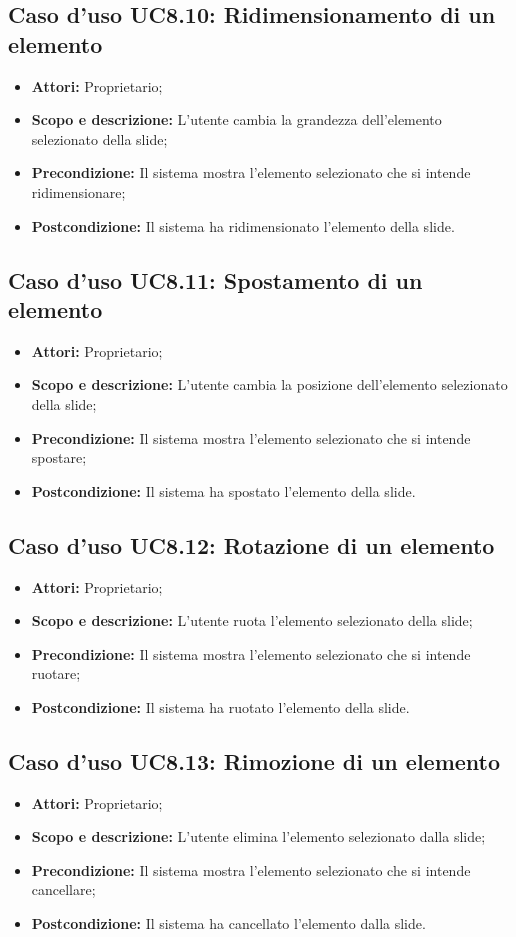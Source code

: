 \subsection{Caso d'uso UC8.10: Ridimensionamento di un elemento}
\begin{itemize}
	\item \textbf{Attori:} Proprietario;
	\item \textbf{Scopo e descrizione:} L'utente cambia la grandezza dell'elemento selezionato della slide;
	\item \textbf{Precondizione:} Il sistema mostra l'elemento selezionato che si intende ridimensionare;
	\item \textbf{Postcondizione:} Il sistema ha ridimensionato l'elemento della slide.
\end{itemize}


\subsection{Caso d'uso UC8.11: Spostamento di un elemento}
\begin{itemize}
	\item \textbf{Attori:} Proprietario;
	\item \textbf{Scopo e descrizione:} L'utente cambia la posizione dell'elemento selezionato della slide;
	\item \textbf{Precondizione:} Il sistema mostra l'elemento selezionato che si intende spostare;
	\item \textbf{Postcondizione:} Il sistema ha spostato l'elemento della slide.
\end{itemize}


\subsection{Caso d'uso UC8.12: Rotazione di un elemento}
\begin{itemize}
	\item \textbf{Attori:} Proprietario;
	\item \textbf{Scopo e descrizione:} L'utente ruota l'elemento selezionato della slide;
	\item \textbf{Precondizione:} Il sistema mostra l'elemento selezionato che si intende ruotare;
	\item \textbf{Postcondizione:} Il sistema ha ruotato l'elemento della slide.
\end{itemize}


\subsection{Caso d'uso UC8.13: Rimozione di un elemento}
\begin{itemize}
	\item \textbf{Attori:} Proprietario;
	\item \textbf{Scopo e descrizione:} L'utente elimina l'elemento selezionato dalla slide;
	\item \textbf{Precondizione:} Il sistema mostra l'elemento selezionato che si intende cancellare;
	\item \textbf{Postcondizione:} Il sistema ha cancellato l'elemento dalla slide.
\end{itemize}



